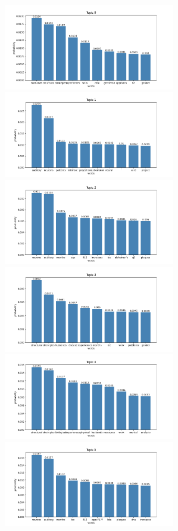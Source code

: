 \documentclass[10pt]{article} %
\begin{document}
	\begin{center}
		\includegraphics[width=7.5cm]{images/plots/test_8_no_stopwords/topic_0.png}
		\includegraphics[width=7.5cm]{images/plots/test_8_no_stopwords/topic_1.png}
		\includegraphics[width=7.5cm]{images/plots/test_8_no_stopwords/topic_2.png}
		\includegraphics[width=7.5cm]{images/plots/test_8_no_stopwords/topic_3.png}\
		\includegraphics[width=7.5cm]{images/plots/test_8_no_stopwords/topic_4.png}
		\includegraphics[width=7.5cm]{images/plots/test_8_no_stopwords/topic_5.png}

\end{center}
\end{document}
